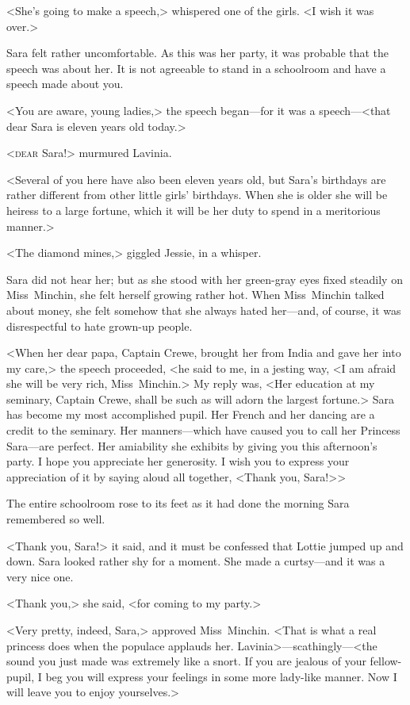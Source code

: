 <She's going to make a speech,> whispered one of the girls. <I wish it was over.>

Sara felt rather uncomfortable. As this was her party, it was probable that the speech was about her. It is not agreeable to stand in a schoolroom and have a speech made about you.

<You are aware, young ladies,> the speech began—for it was a speech—<that dear Sara is eleven years old today.>

<\textsc{dear} Sara!> murmured Lavinia.

<Several of you here have also been eleven years old, but Sara's birthdays are rather different from other little girls' birthdays. When she is older she will be heiress to a large fortune, which it will be her duty to spend in a meritorious manner.>

<The diamond mines,> giggled Jessie, in a whisper.

Sara did not hear her; but as she stood with her green-gray eyes fixed steadily on Miss~Minchin, she felt herself growing rather hot. When Miss~Minchin talked about money, she felt somehow that she always hated her—and, of course, it was disrespectful to hate grown-up people.

<When her dear papa, Captain Crewe, brought her from India and gave her into my care,> the speech proceeded, <he said to me, in a jesting way, <I am afraid she will be very rich, Miss~Minchin.> My reply was, <Her education at my seminary, Captain Crewe, shall be such as will adorn the largest fortune.> Sara has become my most accomplished pupil. Her French and her dancing are a credit to the seminary. Her manners—which have caused you to call her Princess Sara—are perfect. Her amiability she exhibits by giving you this afternoon's party. I hope you appreciate her generosity. I wish you to express your appreciation of it by saying aloud all together, <Thank you, Sara!>>

The entire schoolroom rose to its feet as it had done the morning Sara remembered so well.

<Thank you, Sara!> it said, and it must be confessed that Lottie jumped up and down. Sara looked rather shy for a moment. She made a curtsy—and it was a very nice one.

<Thank you,> she said, <for coming to my party.>

<Very pretty, indeed, Sara,> approved Miss~Minchin. <That is what a real princess does when the populace applauds her. Lavinia>—scathingly—<the sound you just made was extremely like a snort. If you are jealous of your fellow-pupil, I beg you will express your feelings in some more lady-like manner. Now I will leave you to enjoy yourselves.>

